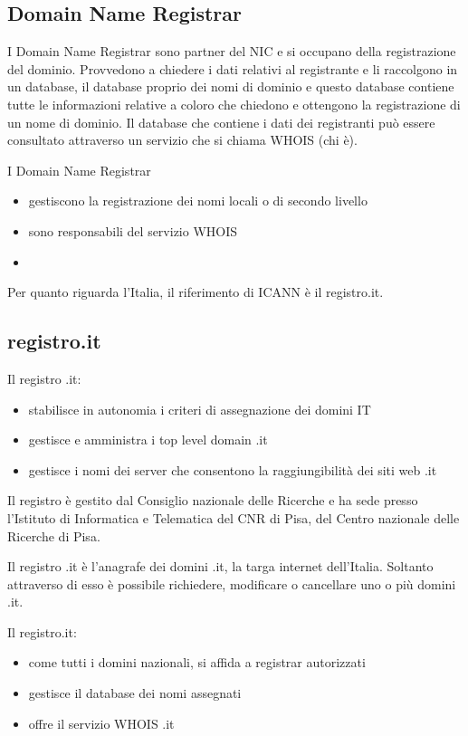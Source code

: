   \subsection{Domain Name Registrar}
  I Domain Name Registrar sono partner del NIC e si occupano della registrazione del dominio. 
  Provvedono a chiedere i dati relativi al registrante e li raccolgono in un database, il database proprio dei nomi di dominio e questo database contiene tutte le informazioni relative a coloro che chiedono e ottengono la registrazione di un nome di dominio. Il database che contiene i dati dei registranti può essere consultato attraverso un servizio che si chiama WHOIS (chi è).
  
  I Domain Name Registrar
  \begin{itemize}
      \item gestiscono la registrazione dei nomi locali o di secondo livello 
      \item sono responsabili del servizio WHOIS 
      \item 
  \end{itemize}{}
  
   Per quanto riguarda l'Italia, il riferimento di ICANN è il registro.it. 
   \subsection{registro.it}
    Il registro .it:
   \begin{itemize}
       \item stabilisce in autonomia i criteri di assegnazione dei domini IT 
       \item gestisce e amministra i top level domain .it 
       \item gestisce i nomi dei server che consentono la raggiungibilità dei siti web .it 
   \end{itemize}
   
   Il registro è gestito dal Consiglio nazionale delle Ricerche e ha sede presso l'Istituto di Informatica e Telematica del CNR di Pisa, del Centro nazionale delle Ricerche di Pisa.\par
   Il registro .it è l'anagrafe dei domini .it, la targa internet dell'Italia. Soltanto attraverso di esso è possibile richiedere, modificare o cancellare uno o più domini .it.\par
   Il registro.it:
   \begin{itemize}
       \item come tutti i domini nazionali, si affida a registrar autorizzati 
       \item gestisce il database dei nomi assegnati 
       \item offre il servizio WHOIS .it
   \end{itemize}
    
